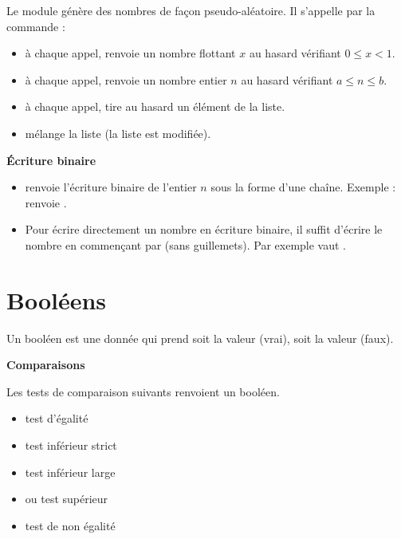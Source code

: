 \documentclass[11pt,class=report,crop=false]{standalone}
\begin{document}
Le module  génère des nombres de façon pseudo-aléatoire. Il s'appelle par la commande :\\
\centerline{}

\begin{itemize}
  \item {}\quad à chaque appel, renvoie un nombre flottant $x$ au hasard vérifiant  $0 \le x < 1$.
  \item {} \quad à chaque appel, renvoie un nombre entier $n$ au hasard vérifiant $a \le n \le b$.
  \item  {} \quad à chaque appel, tire au hasard un élément de la liste.
  \item {} \quad mélange la liste (la liste est modifiée).
 \end{itemize}

\bigskip

\textbf{\'Ecriture binaire}

\begin{itemize}
  \item {}\quad renvoie l'écriture binaire de l'entier $n$ sous la forme d'une chaîne. 
  Exemple :  renvoie .
  
  \item Pour écrire directement un nombre en écriture binaire, il suffit d'écrire le nombre en commençant par  (sans guillemets). Par exemple  vaut .
 \end{itemize}




\section{Booléens}

Un booléen est une donnée qui prend soit la valeur  (\og{}vrai\fg{}), soit la valeur  (\og{}faux\fg{}).

  
\bigskip

\textbf{Comparaisons}
 
Les tests de comparaison suivants renvoient un booléen.
  \begin{itemize}
    \item {} \quad test d'égalité
    	\item {} \quad test inférieur strict
    	\item {} \quad test inférieur large
    	\item {} \quad ou \quad {}\quad test supérieur
    	\item {} \quad test de non égalité
  \end{itemize}
  
\end{document}
